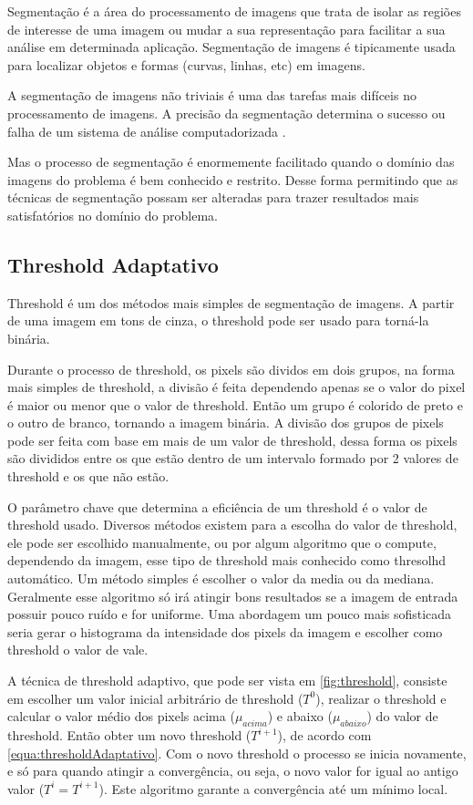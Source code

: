 Segmentação é a área do processamento de imagens que trata de isolar as regiões de interesse de uma imagem ou mudar a sua representação para facilitar a sua análise em determinada aplicação. Segmentação de imagens é tipicamente usada para localizar objetos e formas (curvas, linhas, etc) em imagens.

A segmentação de imagens não triviais é uma das tarefas mais difíceis no processamento de imagens. A precisão da segmentação determina o sucesso ou falha de um sistema de análise computadorizada \cite{gonzalez}.

Mas o processo de segmentação é enormemente facilitado quando o domínio das imagens do problema é bem conhecido e restrito. Desse forma permitindo que as técnicas de segmentação possam ser alteradas para trazer resultados mais satisfatórios no domínio do problema.

\subsection{Threshold Adaptativo}
\label{subsec:threshold}

Threshold é um dos métodos mais simples de segmentação de imagens. A partir de uma imagem em tons de cinza, o threshold pode ser usado para torná-la binária.

Durante o processo de threshold, os pixels são dividos em dois grupos, na forma mais simples de threshold, a divisão é feita dependendo apenas se o valor do pixel é maior ou menor que o valor de threshold. Então um grupo é colorido de preto e o outro de branco, tornando a imagem binária. A divisão dos grupos de pixels pode ser feita com base em mais de um valor de threshold, dessa forma os pixels são divididos entre os que estão dentro de um intervalo formado por 2 valores de threshold e os que não estão.

O parâmetro chave que determina a eficiência de um threshold é o valor de threshold usado. Diversos métodos existem para a escolha do valor de threshold, ele pode ser escolhido manualmente, ou por algum algoritmo que o compute, dependendo da imagem, esse tipo de threshold mais conhecido como thresolhd automático. Um método simples é escolher o valor da media ou da mediana. Geralmente esse algoritmo só irá atingir bons resultados se a imagem de entrada possuir pouco ruído e for uniforme. Uma abordagem um pouco mais sofisticada seria gerar o histograma da intensidade dos pixels da imagem e escolher como threshold o valor de vale.

A técnica de threshold adaptivo, que pode ser vista em \ref{fig:threshold}, consiste em escolher um valor inicial arbitrário de threshold ($T^0$), realizar o threshold e calcular o valor médio dos pixels acima ($\mu_{acima}$) e abaixo ($\mu_{abaixo}$) do valor de threshold. Então obter um novo threshold ($T^{i+1}$), de acordo com \ref{equa:thresholdAdaptativo}. Com o novo threshold o processo se inicia novamente, e só para quando atingir a convergência, ou seja, o novo valor for igual ao antigo valor ($T^i = T^{i+1}$). Este algoritmo garante a convergência até um mínimo local.

